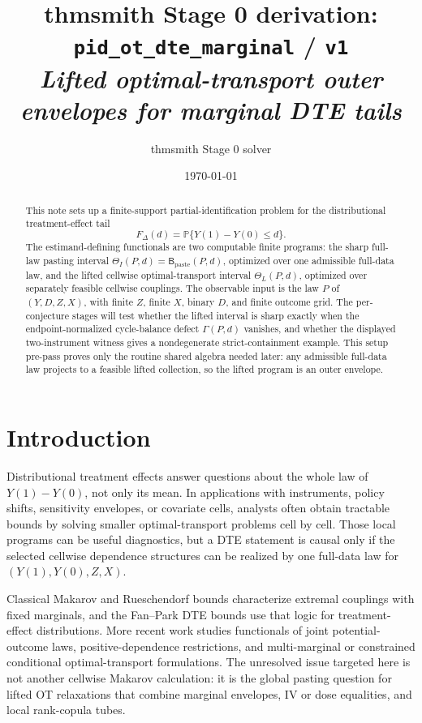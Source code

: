 \documentclass[11pt]{article}
\title{thmsmith Stage 0 derivation: \texttt{pid\_ot\_dte\_marginal} / \texttt{v1}%
  \\ \large\textit{Lifted optimal-transport outer envelopes for marginal DTE tails}}
\author{thmsmith Stage 0 solver}
\date{\today}
\renewcommand{\Pr}{\mathbb{P}}
\theoremstyle{definition}
\theoremstyle{plain}
\theoremstyle{remark}
\begin{document}
\maketitle


\begin{abstract}
This note sets up a finite-support partial-identification problem for the distributional treatment-effect tail
\[
F_\Delta(d)=\Pr\{Y(1)-Y(0)\le d\}.
\]
The estimand-defining functionals are two computable finite programs: the sharp full-law pasting interval \(\Theta_I(P,d)=\mathsf B_{\mathrm{paste}}(P,d)\), optimized over one admissible full-data law, and the lifted cellwise optimal-transport interval \(\Theta_L(P,d)\), optimized over separately feasible cellwise couplings.  The observable input is the law \(P\) of \((Y,D,Z,X)\), with finite \(Z\), finite \(X\), binary \(D\), and finite outcome grid.  The per-conjecture stages will test whether the lifted interval is sharp exactly when the endpoint-normalized cycle-balance defect \(\Gamma(P,d)\) vanishes, and whether the displayed two-instrument witness gives a nondegenerate strict-containment example.  This setup pre-pass proves only the routine shared algebra needed later: any admissible full-data law projects to a feasible lifted collection, so the lifted program is an outer envelope.
\end{abstract}

\section{Introduction}
Distributional treatment effects answer questions about the whole law of \(Y(1)-Y(0)\), not only its mean.  In applications with instruments, policy shifts, sensitivity envelopes, or covariate cells, analysts often obtain tractable bounds by solving smaller optimal-transport problems cell by cell.  Those local programs can be useful diagnostics, but a DTE statement is causal only if the selected cellwise dependence structures can be realized by one full-data law for \((Y(1),Y(0),Z,X)\).

Classical Makarov and Rueschendorf bounds characterize extremal couplings with fixed marginals, and the Fan--Park DTE bounds use that logic for treatment-effect distributions.  More recent work studies functionals of joint potential-outcome laws, positive-dependence restrictions, and multi-marginal or constrained conditional optimal-transport formulations.  The unresolved issue targeted here is not another cellwise Makarov calculation: it is the global pasting question for lifted OT relaxations that combine marginal envelopes, IV or dose equalities, and local rank-copula tubes.
\end{document}
